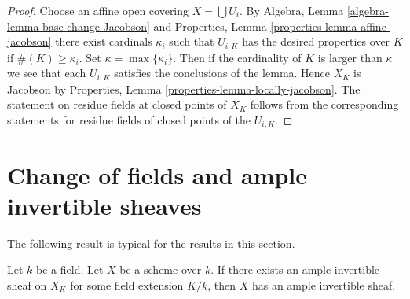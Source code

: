 \begin{proof}
Choose an affine open covering $X = \bigcup U_i$.
By
Algebra, Lemma \ref{algebra-lemma-base-change-Jacobson}
and
Properties, Lemma \ref{properties-lemma-affine-jacobson}
there exist cardinals $\kappa_i$ such that $U_{i, K}$ has
the desired properties over $K$ if $\#(K) \geq \kappa_i$.
Set $\kappa = \max\{\kappa_i\}$. Then if the cardinality of
$K$ is larger than $\kappa$ we see that each $U_{i, K}$ satisfies
the conclusions of the lemma. Hence $X_K$ is Jacobson by
Properties, Lemma \ref{properties-lemma-locally-jacobson}.
The statement on residue fields at closed points of $X_K$
follows from the corresponding
statements for residue fields of closed points of the $U_{i, K}$.
\end{proof}





\section{Change of fields and ample invertible sheaves}
\label{section-change-fields-ample}

\noindent
The following result is typical for the results in this section.

\begin{lemma}
\label{lemma-ample-after-field-extension}
Let $k$ be a field. Let $X$ be a scheme over $k$.
If there exists an ample invertible sheaf on $X_K$ for some
field extension $K/k$, then $X$ has an ample invertible
sheaf.
\end{lemma}

